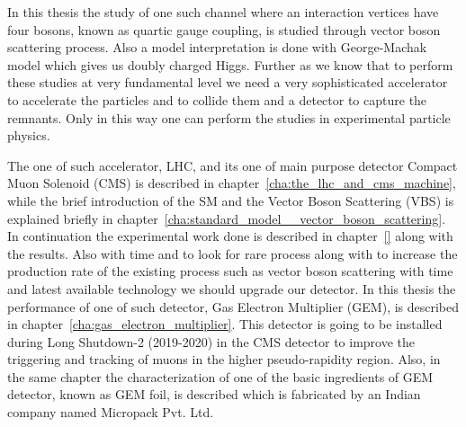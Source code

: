 In this thesis the study of one such channel where an interaction vertices have four bosons, known as quartic gauge coupling, is studied through vector boson scattering process.
Also a model interpretation is done with George-Machak model which gives us doubly charged Higgs.
Further as we know that to perform these studies at very fundamental level we need a very sophisticated accelerator to accelerate the particles and to collide them and a detector to capture the remnants.
Only in this way one can perform the studies in experimental particle physics.

The one of such accelerator, LHC, and its one of main purpose detector Compact Muon Solenoid (CMS) is described in chapter~\ref{cha:the_lhc_and_cms_machine}, while the brief introduction of the SM and the Vector Boson Scattering (VBS) is explained briefly in chapter~\ref{cha:standard_model__vector_boson_scattering}. In continuation the experimental work done is described in chapter~\ref{} along with the results. Also with time and to look for rare process along with to increase the production rate of the existing process such as vector boson scattering with time and latest available technology we should upgrade our detector. In this thesis the performance of one of such detector, Gas Electron Multiplier (GEM), is described in chapter~\ref{cha:gas_electron_multiplier}. This detector is going to be installed during Long Shutdown-2 (2019-2020) in the CMS detector to improve the triggering and tracking of muons in the higher pseudo-rapidity region. Also, in the same chapter the characterization of one of the basic ingredients of GEM detector, known as GEM foil, is described which is fabricated by an Indian company named Micropack Pvt. Ltd.
